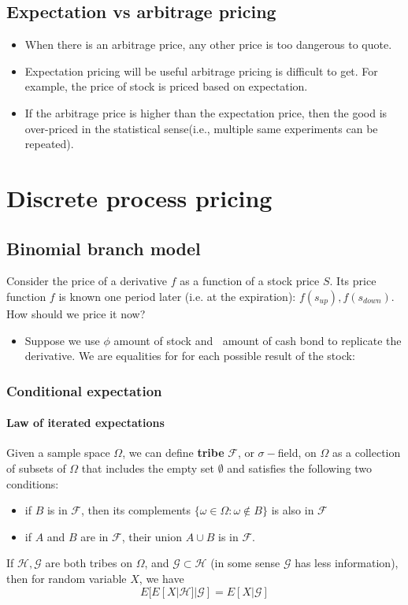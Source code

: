 \documentclass[a4paper,13pt]{report}
\begin{document}
\subsection{Expectation vs arbitrage pricing}
\begin{itemize}
    \item When there is an arbitrage price, any other price is too dangerous to quote.
    \item Expectation pricing will be useful arbitrage pricing is difficult to get. For example, the price of stock is priced based on expectation. 
    \item If the arbitrage price is higher than the expectation price, then the good is over-priced in the statistical sense(i.e., multiple same experiments can be repeated).
\end{itemize}

\section{Discrete process pricing}
\subsection{Binomial branch model}
Consider the price of a derivative $f$ as a function of a stock price $S$. Its price function $f$ is known one period later (i.e. at the expiration): $f(s_{up}), f(s_{down})$. How should we price it now?
\begin{itemize}
    \item Suppose we use $\phi$ amount of stock and $\ $ amount of cash bond to replicate the derivative. We are equalities for for each possible result of the stock:
    
    
\end{itemize}

\subsubsection{Conditional expectation}

\paragraph{Law of iterated expectations\cite{duffie2010dynamic}}
Given a sample space $\Omega$, we can define \textbf{tribe} $\mathcal{F}$, or $\sigma-$field, on $\Omega$ as a collection of subsets of $\Omega$ that includes the empty set $\emptyset$ and satisfies the following two conditions:
\begin{itemize}
    \item if $B$ is in $\mathcal{F}$, then its complements $\{\omega \in \Omega:\omega \not\in B\}$ is also in $\mathcal{F}$
    \item if $A$ and $B$ are in $\mathcal{F}$, their union $A\cup B$ is in $\mathcal{F}$.
\end{itemize}
If $\mathcal{H},\mathcal{G}$ are both tribes on $\Omega$, and $\mathcal{G}\subset \mathcal{H}$ (in some sense $\mathcal{G}$ has less information), then for random variable $X$, we have $$E[E[X|\mathcal{H}]|\mathcal{G}]=E[X|\mathcal{G}]$$
\end{document}
